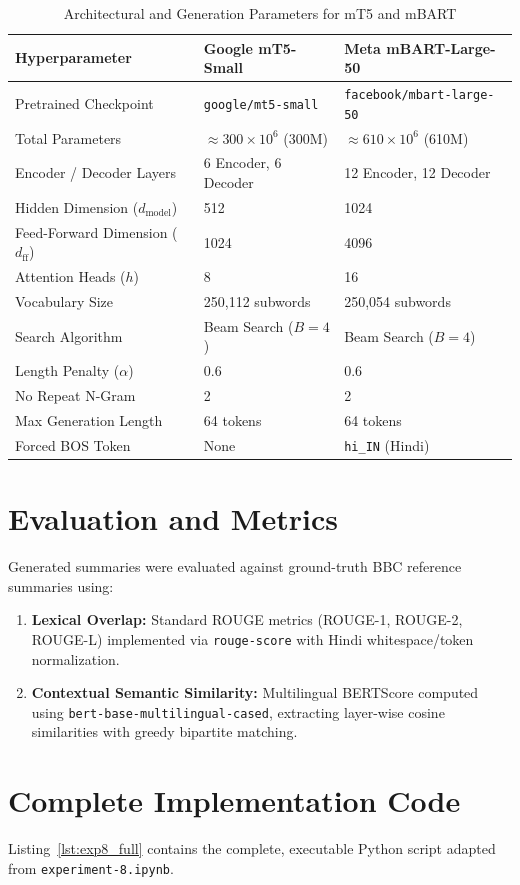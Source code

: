 \begin{table}[H]
\centering
\caption{Architectural and Generation Parameters for mT5 and mBART}
\label{tab:exp8_models}
\begin{tabularx}{\textwidth}{lXX}
\toprule
\textbf{Hyperparameter} & \textbf{Google mT5-Small} & \textbf{Meta mBART-Large-50} \\
\midrule
Pretrained Checkpoint & \texttt{google/mt5-small} & \texttt{facebook/mbart-large-50} \\
Total Parameters & $\approx 300 \times 10^6$ (300M) & $\approx 610 \times 10^6$ (610M) \\
Encoder / Decoder Layers & 6 Encoder, 6 Decoder & 12 Encoder, 12 Decoder \\
Hidden Dimension ($d_{\text{model}}$) & 512 & 1024 \\
Feed-Forward Dimension ($d_{\text{ff}}$) & 1024 & 4096 \\
Attention Heads ($h$) & 8 & 16 \\
Vocabulary Size & 250,112 subwords & 250,054 subwords \\
Search Algorithm & Beam Search ($B=4$) & Beam Search ($B=4$) \\
Length Penalty ($\alpha$) & 0.6 & 0.6 \\
No Repeat N-Gram & 2 & 2 \\
Max Generation Length & 64 tokens & 64 tokens \\
Forced BOS Token & None & \texttt{hi\_IN} (Hindi) \\
\bottomrule
\end{tabularx}
\end{table}

\section{Evaluation and Metrics}
Generated summaries were evaluated against ground-truth BBC reference summaries using:
\begin{enumerate}
    \item \textbf{Lexical Overlap:} Standard ROUGE metrics (ROUGE-1, ROUGE-2, ROUGE-L) implemented via \texttt{rouge-score} with Hindi whitespace/token normalization.
    \item \textbf{Contextual Semantic Similarity:} Multilingual BERTScore computed using \texttt{bert-base-multilingual-cased}, extracting layer-wise cosine similarities with greedy bipartite matching.
\end{enumerate}

\section{Complete Implementation Code}
Listing~\ref{lst:exp8_full} contains the complete, executable Python script adapted from \texttt{experiment-8.ipynb}.

